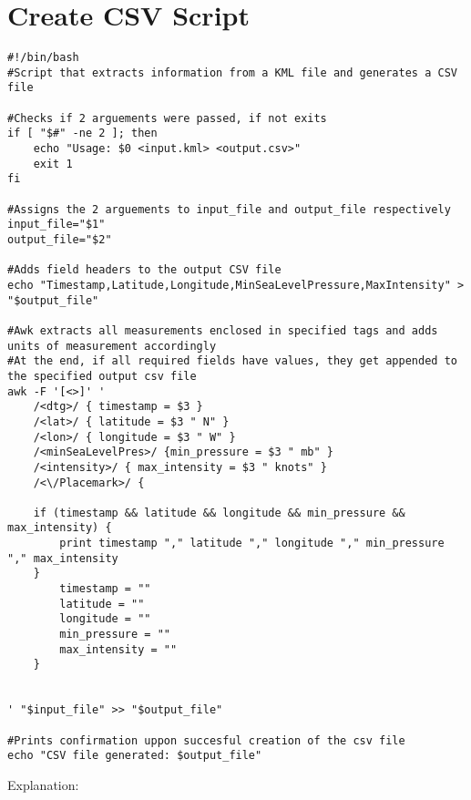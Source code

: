 \documentclass[]{article}
\begin{document}
\section{Create CSV Script}
\begin{lstlisting}[style=scriptstyle]
#!/bin/bash
#Script that extracts information from a KML file and generates a CSV file
    
#Checks if 2 arguements were passed, if not exits
if [ "$#" -ne 2 ]; then
    echo "Usage: $0 <input.kml> <output.csv>"
    exit 1
fi
    
#Assigns the 2 arguements to input_file and output_file respectively
input_file="$1"
output_file="$2"
    
#Adds field headers to the output CSV file
echo "Timestamp,Latitude,Longitude,MinSeaLevelPressure,MaxIntensity" > "$output_file"

#Awk extracts all measurements enclosed in specified tags and adds units of measurement accordingly    
#At the end, if all required fields have values, they get appended to the specified output csv file
awk -F '[<>]' '
    /<dtg>/ { timestamp = $3 } 
    /<lat>/ { latitude = $3 " N" } 
    /<lon>/ { longitude = $3 " W" } 
    /<minSeaLevelPres>/ {min_pressure = $3 " mb" } 
    /<intensity>/ { max_intensity = $3 " knots" } 
    /<\/Placemark>/ {
    
    if (timestamp && latitude && longitude && min_pressure && max_intensity) {
        print timestamp "," latitude "," longitude "," min_pressure "," max_intensity
    }
        timestamp = ""
        latitude = ""
        longitude = ""
        min_pressure = ""
        max_intensity = ""
    }
    

' "$input_file" >> "$output_file"

#Prints confirmation uppon succesful creation of the csv file
echo "CSV file generated: $output_file"

\end{lstlisting}
Explanation: 
\end{document}
